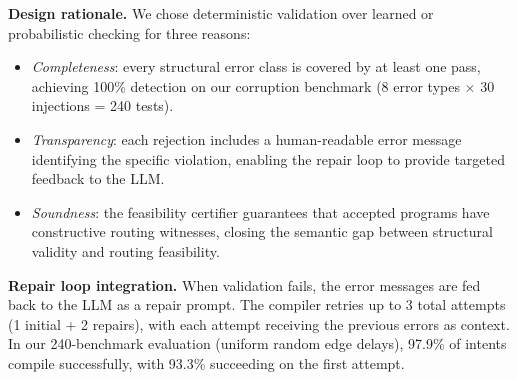 \noindent\textbf{Design rationale.} We chose deterministic
validation over learned or probabilistic checking for three reasons:
\begin{itemize}
\item \textit{Completeness}: every structural error class is covered by
at least one pass, achieving 100\% detection on our corruption benchmark
(8 error types $\times$ 30 injections = 240 tests).
\item \textit{Transparency}: each rejection includes a human-readable
error message identifying the specific violation, enabling the repair
loop to provide targeted feedback to the LLM.
\item \textit{Soundness}: the feasibility certifier guarantees that
accepted programs have constructive routing witnesses, closing the
semantic gap between structural validity and routing feasibility.
\end{itemize}

\noindent\textbf{Repair loop integration.} When validation fails, the
error messages are fed back to the LLM as a repair prompt. The compiler
retries up to 3 total attempts (1 initial + 2 repairs), with each attempt receiving the previous
errors as context. In our 240-benchmark evaluation (uniform random edge delays), 97.9\% of intents
compile successfully, with 93.3\% succeeding on the first attempt.
